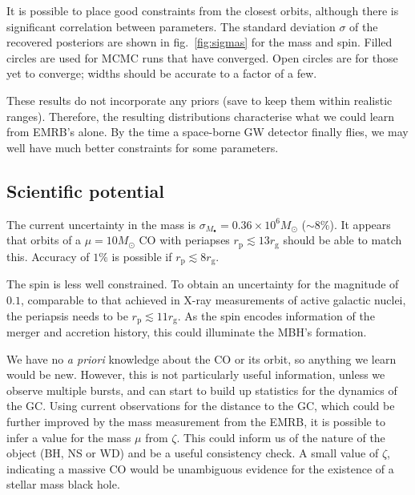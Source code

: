 \documentclass[11pt,twoside]{article}
\begin{document}
It is possible to place good constraints from the closest orbits, although there is significant correlation between parameters. The standard deviation $\sigma$ of the recovered posteriors are shown in fig.~\ref{fig:sigmas} for the mass and spin. Filled circles are used for MCMC runs that have converged. Open circles are for those yet to converge; widths should be accurate to a factor of a few.
\begin{figure*}
\begin{center}
\caption{Distribution widths as functions of periapse $r_\mathrm{p}$. Filled circles are used for converged runs; open circles for unconverged runs. The dotted line is the current uncertainty for $M_\bullet$; the dashed line the standard deviation for an uninformative prior, and the solid line the total prior range.}
\label{fig:sigmas}
\end{center}
\end{figure*}
These results do not incorporate any priors (save to keep them within realistic ranges). Therefore, the resulting distributions characterise what we could learn from EMRB's alone. By the time a space-borne GW detector finally flies, we may well have much better constraints for some parameters.

\subsection{Scientific potential}

The current uncertainty in the mass is $\sigma_{M_\bullet} = 0.36 \times 10^6 M_\odot$ ($\sim 8\%$). It appears that orbits of a $\mu = 10 M_\odot$ CO with periapses $r_\mathrm{p} \lesssim 13 r_\mathrm{g}$ should be able to match this. Accuracy of $1\%$ is possible if $r_\mathrm{p} \lesssim 8 r_\mathrm{g}$.

The spin is less well constrained. To obtain an uncertainty for the magnitude of $0.1$, comparable to that achieved in X-ray measurements of active galactic nuclei, the periapsis needs to be $r_\mathrm{p} \lesssim 11 r_\mathrm{g}$. As the spin encodes information of the merger and accretion history, this could illuminate the MBH's formation.

We have no {\it a priori} knowledge about the CO or its orbit, so anything we learn would be new. However, this is not particularly useful information, unless we observe multiple bursts, and can start to build up statistics for the dynamics of the GC. Using current observations for the distance to the GC, which could be further improved by the mass measurement from the EMRB, it is possible to infer a value for the mass $\mu$ from $\zeta$. This could inform us of the nature of the object (BH, NS or WD) and be a useful consistency check. A small value of $\zeta$, indicating a massive CO would be unambiguous evidence for the existence of a stellar mass black hole.



\end{document}
